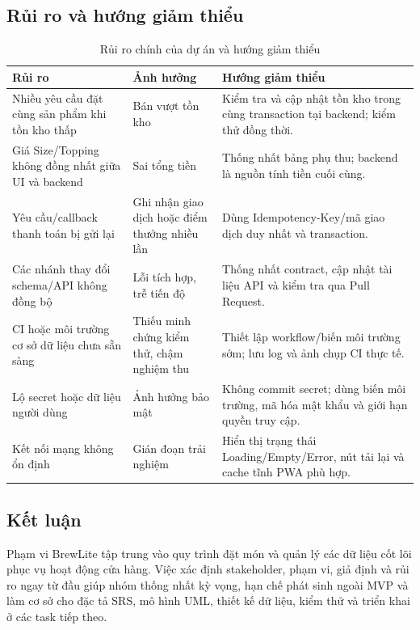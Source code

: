 \subsection{Rủi ro và hướng giảm thiểu}
\begin{table}[htbp]
\centering
\small
\caption{Rủi ro chính của dự án và hướng giảm thiểu}
\begin{tabular}{|p{}|p{}|p{}|}
\hline
\textbf{Rủi ro} & \textbf{Ảnh hưởng} & \textbf{Hướng giảm thiểu} \\
\hline
Nhiều yêu cầu đặt cùng sản phẩm khi tồn kho thấp & Bán vượt tồn kho & Kiểm tra và cập nhật tồn kho trong cùng transaction tại backend; kiểm thử đồng thời. \\
\hline
Giá Size/Topping không đồng nhất giữa UI và backend & Sai tổng tiền & Thống nhất bảng phụ thu; backend là nguồn tính tiền cuối cùng. \\
\hline
Yêu cầu/callback thanh toán bị gửi lại & Ghi nhận giao dịch hoặc điểm thưởng nhiều lần & Dùng Idempotency-Key/mã giao dịch duy nhất và transaction. \\
\hline
Các nhánh thay đổi schema/API không đồng bộ & Lỗi tích hợp, trễ tiến độ & Thống nhất contract, cập nhật tài liệu API và kiểm tra qua Pull Request. \\
\hline
CI hoặc môi trường cơ sở dữ liệu chưa sẵn sàng & Thiếu minh chứng kiểm thử, chậm nghiệm thu & Thiết lập workflow/biến môi trường sớm; lưu log và ảnh chụp CI thực tế. \\
\hline
Lộ secret hoặc dữ liệu người dùng & Ảnh hưởng bảo mật & Không commit secret; dùng biến môi trường, mã hóa mật khẩu và giới hạn quyền truy cập. \\
\hline
Kết nối mạng không ổn định & Gián đoạn trải nghiệm & Hiển thị trạng thái Loading/Empty/Error, nút tải lại và cache tĩnh PWA phù hợp. \\
\hline
\end{tabular}
\end{table}

\subsection{Kết luận}

Phạm vi BrewLite tập trung vào quy trình đặt món và quản lý các dữ liệu cốt lõi phục vụ hoạt động cửa hàng. Việc xác định stakeholder, phạm vi, giả định và rủi ro ngay từ đầu giúp nhóm thống nhất kỳ vọng, hạn chế phát sinh ngoài MVP và làm cơ sở cho đặc tả SRS, mô hình UML, thiết kế dữ liệu, kiểm thử và triển khai ở các task tiếp theo.

